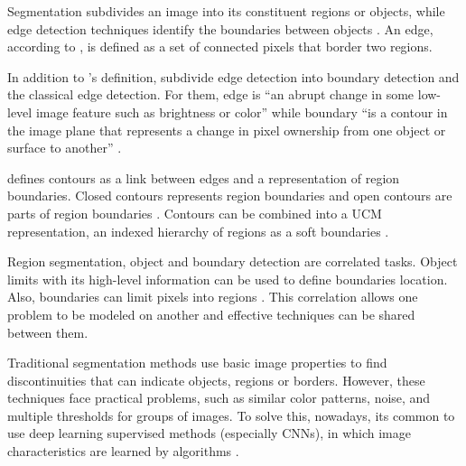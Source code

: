

Segmentation subdivides an image into its constituent regions or objects, while edge detection techniques identify the boundaries between objects \cite{gonzalez2002digital}.
An edge, according to \cite{gonzalez2002digital}, is defined as a set of connected pixels that border two regions.

In addition to \cite{gonzalez2002digital}'s definition, \cite{MARTIN:1273918} subdivide edge detection into boundary detection and the classical edge detection.
For them, edge is ``an abrupt change in some low-level image feature such as brightness or color'' while boundary ``is a contour in the image plane that represents a change in pixel ownership from one object or surface to another'' \cite{MARTIN:1273918}. 

\cite{Jain:1995} defines contours as a link between edges and a representation of region boundaries.
Closed contours represents region boundaries and open contours are parts of region boundaries \cite{Jain:1995}.
Contours can be combined into a UCM representation, an indexed hierarchy of regions as a soft boundaries \cite{Arbelaez:2006}.

Region segmentation, object and boundary detection are correlated tasks.
Object limits with its high-level information can be used to define boundaries location.
Also, boundaries can limit pixels into regions \cite{MARTIN:1273918}.
This correlation allows one problem to be modeled on another and effective techniques can be shared between them.

Traditional segmentation methods use basic image properties to find discontinuities that can indicate objects, regions or borders.
However, these techniques face practical problems, such as similar color patterns, noise, and multiple thresholds for groups of images.
To solve this, nowadays, its common to use deep learning supervised methods (especially CNNs), in which image characteristics are learned by algorithms \cite{MARTIN:1273918} \cite{Segnet:2017:7803544}.

